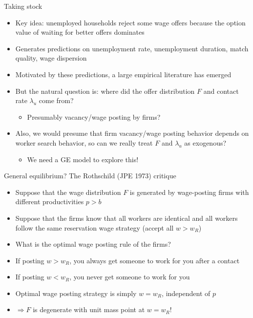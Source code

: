 \documentclass[9pt]{beamer}
\newcommand{\bit}{\begin{itemize}}
\newcommand{\eit}{\end{itemize}}
\begin{document}
\begin{frame}{Taking stock}

\bit
\setlength\itemsep{2em}

\item Key idea: unemployed households reject some wage offers because the option value of waiting for better offers dominates

\item Generates predictions on unemployment rate, unemployment duration, match quality, wage dispersion

\item Motivated by these predictions, a large empirical literature has emerged

\item But the natural question is: where did the offer distribution $F$ and contact rate $\lambda_u$ come from?
\bit
	\item Presumably vacancy/wage posting by firms?
\eit

\item Also, we would presume that firm vacancy/wage posting behavior depends on worker search behavior, so can we really treat $F$ and $\lambda_u$ as exogenous?
\bit
	\item We need a GE model to explore this!
\eit

\eit
\end{frame}

\begin{frame}{General equilibrium? The Rothschild (JPE 1973) critique}

\bit
\setlength\itemsep{1.5em}

\item Suppose that the wage distribution $F$ is generated by wage-posting firms with different productivities $p>b$

\item Suppose that the firms know that all workers are identical and all workers follow the same reservation wage strategy (accept all $w>w_R$)

\item What is the optimal wage posting rule of the firms?

\item If posting $w>w_R$, you always get someone to work for you after a contact

\item If posting $w<w_R$, you never get someone to work for you

\item Optimal wage posting strategy is simply $w=w_R$, independent of $p$

\item $\Rightarrow F$ is degenerate with unit mass point at $w=w_R$!

\eit
\end{frame}
\end{document}
